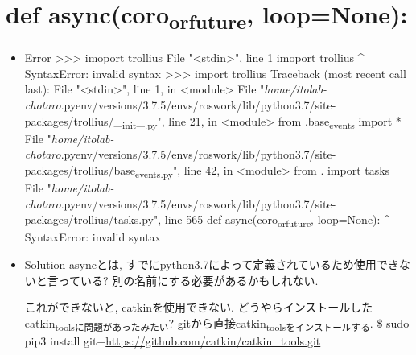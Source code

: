 \documentclass[11pt]{article}
\author{itolab-chotaro}
\date{\today}
\title{}
\begin{document}
\tableofcontents

\section{def async(coro\textsubscript{or}\textsubscript{future}, loop=None):}
\label{sec:org075847c}
\begin{itemize}
\item Error
>>> imoport trollius
File "<stdin>", line 1
  imoport trollius
                \^{}
SyntaxError: invalid syntax
>>> import trollius
Traceback (most recent call last):
  File "<stdin>", line 1, in <module>
  File "\emph{home/itolab-chotaro}.pyenv/versions/3.7.5/envs/roswork/lib/python3.7/site-packages/trollius/\_\textsubscript{init}\_\textsubscript{.py}", line 21, in <module>
    from .base\textsubscript{events} import *
  File "\emph{home/itolab-chotaro}.pyenv/versions/3.7.5/envs/roswork/lib/python3.7/site-packages/trollius/base\textsubscript{events.py}", line 42, in <module>
    from . import tasks
  File "\emph{home/itolab-chotaro}.pyenv/versions/3.7.5/envs/roswork/lib/python3.7/site-packages/trollius/tasks.py", line 565
    def async(coro\textsubscript{or}\textsubscript{future}, loop=None):
            \^{}
SyntaxError: invalid syntax

\item Solution
asyncとは, すでにpython3.7によって定義されているため使用できないと言っている?
別の名前にする必要があるかもしれない.

これができないと, catkinを使用できない.
どうやらインストールしたcatkin\textsubscript{toolsに問題があったみたい}?
gitから直接catkin\textsubscript{toolsをインストールする}.
\$ sudo pip3 install git+\url{https://github.com/catkin/catkin\_tools.git}
\end{itemize}
\end{document}
